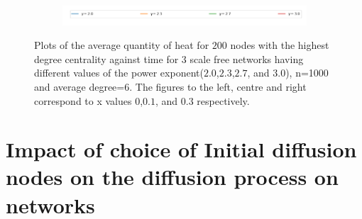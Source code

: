 \documentclass[10pt,a4paper]{article}
\begin{document}
\begin{figure}[!h]
\begin{subfigure}[b]{0.32\textwidth}
	\end{subfigure} \\
	\begin{subfigure}[b]{0.80\textwidth}
		\includegraphics[width= \textwidth]{images/legend-gamma.png}
	\end{subfigure}
	\caption{Plots of the average quantity of heat for $200$ nodes with the highest degree centrality against time for $3$ scale free networks having different values of the power exponent($2.0$,$2.3$,$2.7$, and $3.0$), n=1000 and average degree=$6$. The figures to the left, centre and right correspond to x values $0$,$0.1$, and $0.3$ respectively.}
	\label{quantity-exponents}
\end{figure}


\newpage
\section{Impact of choice of Initial diffusion nodes on the diffusion process on networks}
\end{document}
